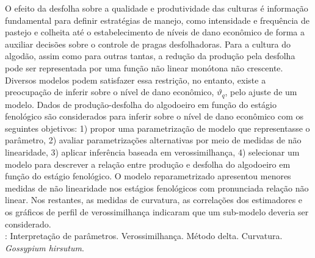 O efeito da desfolha sobre a qualidade e produtividade das culturas é
informação fundamental para definir estratégias de manejo, como
intensidade e frequência de pastejo e colheita até o estabelecimento
de níveis de dano econômico de forma a auxiliar decisões sobre o
controle de pragas desfolhadoras. Para a cultura do algodão, assim
como para outras tantas, a redução da produção pela desfolha pode ser
representada por uma função não linear monótona não
crescente. Diversos modelos podem satisfazer essa restrição, no
entanto, existe a preocupação de inferir sobre o nível de dano
econômico, $\vartheta_q$, pelo ajuste de um modelo. Dados de
produção-desfolha do algodoeiro em função do estágio fenológico são
considerados para inferir sobre o nível de dano econômico com os
seguintes objetivos: 1) propor uma parametrização de modelo que
representasse o parâmetro, 2) avaliar parametrizações alternativas por
meio de medidas de não linearidade, 3) aplicar inferência baseada em
verossimilhança, 4) selecionar um modelo para descrever a relação
entre produção e desfolha do algodoeiro em função do estágio
fenológico. O modelo reparametrizado apresentou menores medidas de não
linearidade nos estágios fenológicos com pronunciada relação não
linear. Nos restantes, as medidas de curvatura, as correlações dos
estimadores e os gráficos de perfil de verossimilhança indicaram que
um sub-modelo deveria ser considerado.\\
\newline
{}: Interpretação de parâmetros. Verossimilhança. Método delta. Curvatura. \emph{Gossypium hirsutum}.
